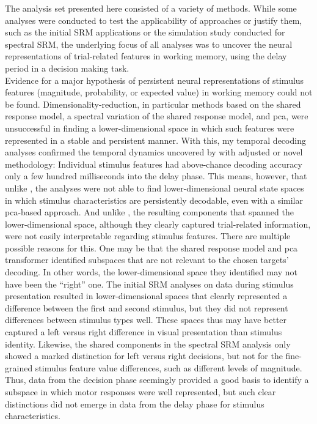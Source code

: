 The analysis set presented here consisted of a variety of methods.
While some analyses were conducted to test the applicability of approaches or justify them, such as the initial \gls{SRM} applications or the simulation study conducted for spectral \gls{SRM}, the underlying focus of all analyses was to uncover the neural representations of trial-related features in working memory, using the delay period in a decision making task.\\
Evidence for a major hypothesis of persistent neural representations of stimulus features (magnitude, probability, or expected value) in working memory could not be found.
Dimensionality-reduction, in particular methods based on the shared response model, a spectral variation of the shared response model, and \gls{pca}, were unsuccessful in finding a lower-dimensional space in which such features were represented in a stable and persistent manner.
With this, my temporal decoding analyses confirmed the temporal dynamics uncovered by \citet{kaiserposter} with adjusted or novel methodology:
Individual stimulus features had above-chance decoding accuracy only a few hundred milliseconds into the delay phase.
This means, however, that unlike \citet{murray2017stable}, the analyses were not able to find lower-dimensional neural state spaces in which stimulus characteristics are persistently decodable, even with a similar \gls{pca}-based approach.
And unlike \citet{machens2010functional}, the resulting components that spanned the lower-dimensional space, although they clearly captured trial-related information, were not easily interpretable regarding stimulus features.
There are multiple possible reasons for this.
One may be that the shared response model and \gls{pca} transformer identified subspaces that are not relevant to the chosen targets' decoding.
In other words, the lower-dimensional space they identified may not have been the ``right'' one.
The initial \gls{SRM} analyses on data during stimulus presentation resulted in lower-dimensional spaces that clearly represented a difference between the first and second stimulus, but they did not represent differences between stimulus types well.
These spaces thus may have better captured a left versus right difference in visual presentation than stimulus identity.
Likewise, the shared components in the spectral \gls{SRM} analysis only showed a marked distinction for left versus right decisions, but not for the fine-grained stimulus feature value differences, such as different levels of magnitude.
Thus, data from the decision phase seemingly provided a good basis to identify a subspace in which motor responses were well represented, but such clear distinctions did not emerge in data from the delay phase for stimulus characteristics.
